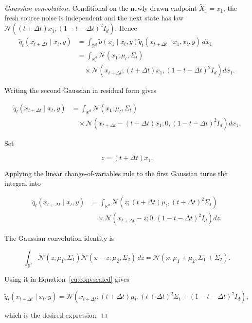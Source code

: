 \documentclass[11pt,a4paper]{article}
\newcommand{\Normal}{\mathcal{N}}
\newcommand{\Dx}{\Delta t}
\begin{document}
\begin{proof}[Gaussian convolution]
Conditional on the newly drawn endpoint $\widetilde X_1=x_1$,
the fresh source noise is independent and the next state has law
$\Normal((t+\Dx)x_1,(1-t-\Dx)^2 I_d)$. Hence
\begin{align}
    \widetilde q_t(x_{t+\Dx}\mid x_t,y)
    &=
    \int_{\mathbb R^d}
    \widetilde p(x_1\mid x_t,y)
    \widetilde q_t(x_{t+\Dx}\mid x_1,x_t,y)
    \,dx_1
    \\
    &=
    \int_{\mathbb R^d}
    \Normal(x_1;\mu_t,\Sigma_t)
    \nonumber\\
    &\quad\times
    \Normal\left(
        x_{t+\Dx};
        (t+\Dx)x_1,
        (1-t-\Dx)^2I_d
    \right)
    dx_1.
    \label{eq:convstart}
\end{align}

Writing the second Gaussian in residual form gives

\begin{align}
    \widetilde q_t(x_{t+\Dx}\mid x_t,y)
    &=
    \int_{\mathbb R^d}
    \Normal(x_1;\mu_t,\Sigma_t)
    \nonumber\\
    &\quad\times
    \Normal\left(
        x_{t+\Dx}-(t+\Dx)x_1;
        0,
        (1-t-\Dx)^2I_d
    \right)
    dx_1.
\end{align}

Set

\begin{equation}
    z=(t+\Dx)x_1.
\end{equation}

Applying the linear change-of-variables rule to the first Gaussian
turns the integral into

\begin{align}
    \widetilde q_t(x_{t+\Dx}\mid x_t,y)
    &=
    \int_{\mathbb R^d}
    \Normal\left(
        z;
        (t+\Dx)\mu_t,
        (t+\Dx)^2\Sigma_t
    \right)
    \nonumber\\
    &\quad\times
    \Normal\left(
        x_{t+\Dx}-z;
        0,
        (1-t-\Dx)^2I_d
    \right)
    dz.
    \label{eq:convscaled}
\end{align}

The Gaussian convolution identity is

\begin{equation}
    \int_{\mathbb R^d}
    \Normal(z;\mu_1,\Sigma_1)
    \Normal(x-z;\mu_2,\Sigma_2)
    \,dz
    =
    \Normal(
        x;
        \mu_1+\mu_2,
        \Sigma_1+\Sigma_2
    ).
    \label{eq:convidentity}
\end{equation}

Using it in Equation~\eqref{eq:convscaled} gives

\begin{equation}
    \widetilde q_t(x_{t+\Dx}\mid x_t,y)
    =
    \Normal\left(
        x_{t+\Dx};
        (t+\Dx)\mu_t,
        (t+\Dx)^2\Sigma_t
        +
        (1-t-\Dx)^2I_d
    \right),
\end{equation}

which is the desired expression.

\end{proof}
\end{document}
